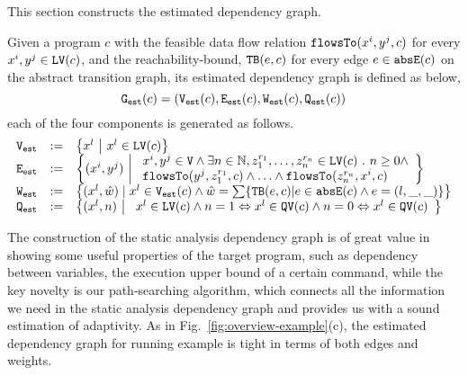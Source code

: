 This section constructs the estimated dependency graph.
\begin{defn}
\label{def:prog_graph}
Given a program $c$ 
with the feasible data flow relation $\mathtt{flowsTo}(x^i, y^j, c)$ for every $x^i, y^j \in \mathtt{LV}(c)$, 
and the reachability-bound, ${\mathtt{TB}}(e, c)$ for every edge $e \in \mathtt{abs}{\mathtt{E}}(c)$ on the abstract transition graph,
its estimated dependency graph is defined as below,
\[\mathtt{{G_{est}}}(c) = (\mathtt{{V_{est}}}(c), \mathtt{{E_{est}}}(c), \mathtt{{W_{est}}}(c), \mathtt{{Q_{est}}}(c))\]
each of the four components is generated as follows.
{\small
\[
\begin{array}{lll}
\progV & := & \left\{ 
x^l
~ \middle\vert ~
x^l \in \lvar(c)
\right\}
\\
\progE & := & 
\left\{ 
(x^i, y^j) 
~ \middle\vert ~
\begin{array}{l}
x^i, y^j \in \vertxs
\land
\exists n \in \mathbb{N}, z_1^{r_1}, \ldots, z_n^{r_n} \in \lvar(c) \st
n \geq 0 \land
\\
\flowsto(y^j, z_1^{r_1}, c) 
\land \ldots \land \flowsto(z_n^{r_n}, x^i, c) 
\end{array}
\right\}
\\
\progW & := &
\left\{ (x^l, \hat{w}) 
\mid
x^l \in \progV(c) 
\land 
\hat{w} = 
\sum\left\{ \absclr(e, c) \middle\vert e \in \absE(c) \land e = (l, \_, \_) \right\}
\right\}
\\
\progF & := & 
\left\{(x^l, n) 
~ \middle\vert ~
\begin{array}{l}
 x^l \in \lvar(c) \land
 n = 1 \Leftrightarrow x^l \in \qvar(c)
\land n = 0 \Leftrightarrow x^l \in \qvar(c)
\end{array}
\right\}
\end{array}
\] }
\end{defn}
The construction of the static analysis dependency graph is of great value in showing some useful properties of the target program,
such as dependency between variables, the execution upper bound of a certain command,
while the key novelty is our path-searching algorithm, which connects all the information we need in the static analysis dependency graph and provides us with a sound estimation of adaptivity.
As in Fig.~\ref{fig:overview-example}(c), the estimated dependency graph for
running example is tight in terms of both edges and weights.
